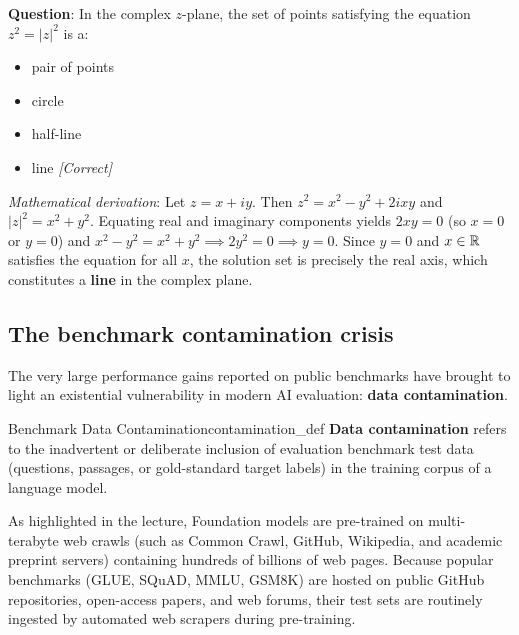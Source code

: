 \documentclass[../../main.tex]{subfiles}
\begin{document}
\begin{center}
\begin{minipage}{0.95\textwidth}
\begin{tcolorbox}[colback=cardBg,colframe=cardLine,arc=2pt,boxrule=0.5pt,title=\textbf{MMLU Example 2: College Mathematics}]
\small\sffamily
\textbf{Question}: In the complex $z$-plane, the set of points satisfying the equation $z^2 = |z|^2$ is a:
\begin{itemize}[leftmargin=1.5em,itemsep=1pt]
    \item[\textbf{(A)}] pair of points
    \item[\textbf{(B)}] circle
    \item[\textbf{(C)}] half-line
    \item[\textbf{(D)}] line \hfill \textit{[Correct]}
\end{itemize}
\textit{Mathematical derivation}: Let $z = x + iy$. Then $z^2 = x^2 - y^2 + 2ixy$ and $|z|^2 = x^2 + y^2$. Equating real and imaginary components yields $2xy = 0$ (so $x=0$ or $y=0$) and $x^2 - y^2 = x^2 + y^2 \implies 2y^2 = 0 \implies y = 0$. Since $y=0$ and $x \in \mathbb{R}$ satisfies the equation for all $x$, the solution set is precisely the real axis, which constitutes a \textbf{line} in the complex plane.
\end{tcolorbox}
\end{minipage}
\end{center}

\subsection{The benchmark contamination crisis}
\label{subsec:contamination_crisis}

The very large performance gains reported on public benchmarks have brought to light an existential vulnerability in modern AI evaluation: \textbf{data contamination}.

\begin{definition}{Benchmark Data Contamination}{contamination_def}
\textbf{Data contamination} refers to the inadvertent or deliberate inclusion of evaluation benchmark test data (questions, passages, or gold-standard target labels) in the training corpus of a language model.
\end{definition}

As highlighted in the lecture, Foundation models are pre-trained on multi-terabyte web crawls (such as Common Crawl, GitHub, Wikipedia, and academic preprint servers) containing hundreds of billions of web pages. Because popular benchmarks (GLUE, SQuAD, MMLU, GSM8K) are hosted on public GitHub repositories, open-access papers, and web forums, their test sets are routinely ingested by automated web scrapers during pre-training.
\end{document}
